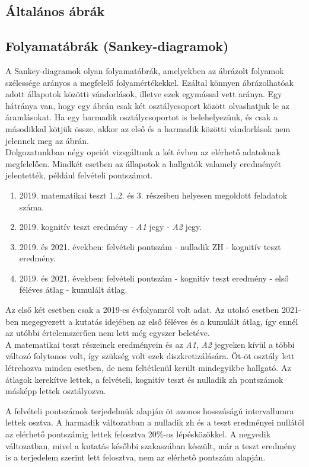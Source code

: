 \documentclass[12pt]{article}
\begin{document}
\subsection{Általános ábrák}

\subsection{Folyamatábrák (Sankey-diagramok)}
A Sankey-diagramok olyan folyamatábrák, amelyekben az ábrázolt folyamok szélessége arányos a megfelelő folyamértékekkel. Ezáltal könnyen ábrázolhatóak adott állapotok közötti vándorlások, illetve ezek egymással vett aránya. Egy hátránya van, hogy egy ábrán csak két osztálycsoport között olvashatjuk le az áramlásokat. Ha egy harmadik osztálycsoportot is belehelyezünk, és csak a másodikkal kötjük össze, akkor az első és a harmadik közötti vándorlások nem jelennek meg az ábrán.\\
Dolgozatunkban négy opciót vizsgáltunk a két évben az elérhető adatoknak megfelelően. Mindkét esetben az állapotok a hallgatók valamely eredményét jelentették, például felvételi pontszámot.
\begin{enumerate}
\item 2019. matematikai teszt 1.,2. és 3. részeiben helyesen megoldott feladatok száma.
\item 2019. kognitív teszt eredmény - \textit{A1} jegy - \textit{A2} jegy.
\item 2019. és 2021. években: felvételi pontszám - nulladik ZH - kognitív teszt eredmény.
\item 2019. és 2021. években: felvételi pontszám - kognitív teszt eredmény - első féléves átlag - kumulált átlag.
\end{enumerate}
Az első két esetben csak a 2019-es évfolyamról volt adat. Az utolsó esetben 2021-ben megegyezett a kutatás idejében az első féléves és a kumulált átlag, így ennél az utóbbi értelemszerűen nem lett még egyszer beletéve.\\

A matematikai teszt részeinek eredményein és az \textit{A1}, \textit{A2} jegyeken kívül a többi változó folytonos volt, így szükség volt ezek diszkretizálására. Öt-öt osztály lett létrehozva minden esetben, de nem feltétlenül került mindegyikbe hallgató. Az átlagok kerekítve lettek, a felvételi, kognitív teszt és nulladik zh pontszámok másképp lettek osztályozva.

A felvételi pontszámok terjedelmük alapján öt azonos hosszúságú intervallumra lettek osztva. A harmadik változatban a nulladik zh és a teszt eredményei nullától az elérhető pontszámig lettek felosztva 20\%-os lépésközökkel. A negyedik változatban, mivel a kutatás későbbi szakaszában készült, már a teszt eredmény is a terjedelem szerint lett felosztva, nem az elérhető pontszám alapján.
\end{document}

